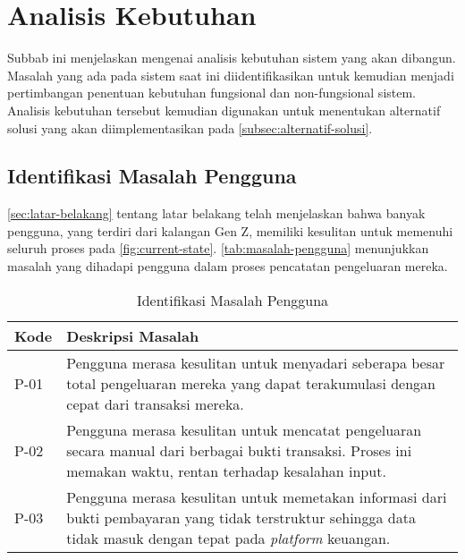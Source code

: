 \section{Analisis Kebutuhan}
\label{sec:analisis-kebutuhan}

Subbab ini menjelaskan mengenai analisis kebutuhan sistem yang akan dibangun. Masalah yang ada pada sistem saat ini diidentifikasikan untuk kemudian menjadi pertimbangan penentuan kebutuhan fungsional dan non-fungsional sistem. Analisis kebutuhan tersebut kemudian digunakan untuk menentukan alternatif solusi yang akan diimplementasikan pada \autoref{subsec:alternatif-solusi}.

\subsection{Identifikasi Masalah Pengguna}
\label{subsec:identifikasi-masalah-pengguna}
\autoref{sec:latar-belakang} tentang latar belakang telah menjelaskan bahwa banyak pengguna, yang terdiri dari kalangan Gen Z, memiliki kesulitan untuk memenuhi seluruh proses pada \autoref{fig:current-state}. \autoref{tab:masalah-pengguna} menunjukkan masalah yang dihadapi pengguna dalam proses pencatatan pengeluaran mereka.

\begin{table}[h!]
\caption{Identifikasi Masalah Pengguna}
\label{tab:masalah-pengguna}
\begin{tabularx}{\linewidth}{|l|X|}
\hline
\textbf{Kode} & \textbf{Deskripsi Masalah} \\
\hline
P-01 & Pengguna merasa kesulitan untuk menyadari seberapa besar total pengeluaran mereka yang dapat terakumulasi dengan cepat dari transaksi mereka. \\
\hline
P-02 & Pengguna merasa kesulitan untuk mencatat pengeluaran secara manual dari berbagai bukti transaksi. Proses ini memakan waktu, rentan terhadap kesalahan input. \\
\hline
P-03 & Pengguna merasa kesulitan untuk memetakan informasi dari bukti pembayaran yang tidak terstruktur sehingga data tidak masuk dengan tepat pada \emph{platform} keuangan. \\
\hline
\end{tabularx}
\end{table}

